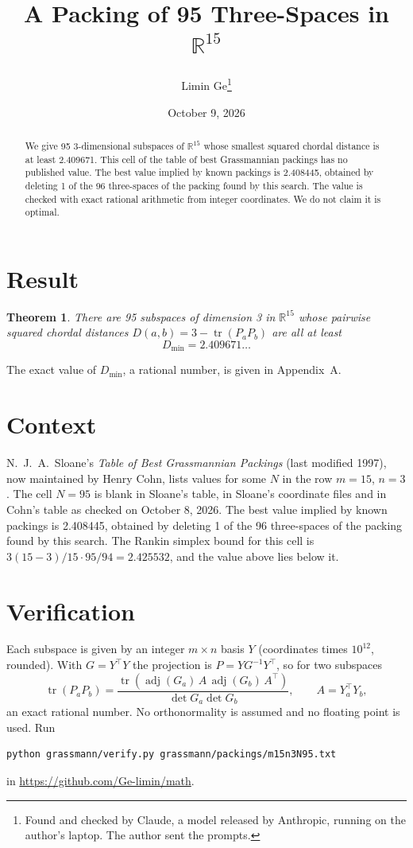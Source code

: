\documentclass[11pt,a4paper]{article}
\title{A Packing of 95 Three-Spaces in $\mathbb{R}^{15}$}
\author{Limin Ge\thanks{Found and checked by Claude, a model released by Anthropic, running on the author's laptop. The author sent the prompts.}}
\date{October 9, 2026}
\newtheorem*{theorem}{Theorem}
\begin{document}
\maketitle
\begin{abstract}
We give 95 3-dimensional subspaces of $\mathbb{R}^{15}$ whose smallest squared chordal distance is at least 2.409671. This cell of the table of best Grassmannian packings has no published value. The best value implied by known packings is 2.408445, obtained by deleting 1 of the 96 three-spaces of the packing found by this search. The value is checked with exact rational arithmetic from integer coordinates. We do not claim it is optimal.
\end{abstract}

\section{Result}
\begin{theorem}
There are 95 subspaces of dimension 3 in $\mathbb{R}^{15}$ whose pairwise squared chordal distances $D(a,b) = 3 - \operatorname{tr}(P_aP_b)$ are all at least
\[ D_{\min} = 2.409671\ldots \]
\end{theorem}
The exact value of $D_{\min}$, a rational number, is given in Appendix~A.


\section{Context}
N.~J.~A.~Sloane's \emph{Table of Best Grassmannian Packings} (last modified 1997), now maintained by Henry Cohn, lists values for some $N$ in the row $m=15$, $n=3$. The cell $N=95$ is blank in Sloane's table, in Sloane's coordinate files and in Cohn's table as checked on October 8, 2026. The best value implied by known packings is 2.408445, obtained by deleting 1 of the 96 three-spaces of the packing found by this search. The Rankin simplex bound for this cell is $3(15-3)/15\cdot 95/94 = 2.425532$, and the value above lies below it.


\section{Verification}
Each subspace is given by an integer $m\times n$ basis $Y$ (coordinates times $10^{12}$, rounded). With $G=Y^\top Y$ the projection is $P=YG^{-1}Y^\top$, so for two subspaces
\[ \operatorname{tr}(P_aP_b)=\frac{\operatorname{tr}(\operatorname{adj}(G_a)\,A\,\operatorname{adj}(G_b)\,A^\top)}{\det G_a\det G_b},\qquad A=Y_a^\top Y_b, \]
an exact rational number. No orthonormality is assumed and no floating point is used. Run
\begin{verbatim}
python grassmann/verify.py grassmann/packings/m15n3N95.txt
\end{verbatim}
in \url{https://github.com/Ge-limin/math}.
\end{document}
